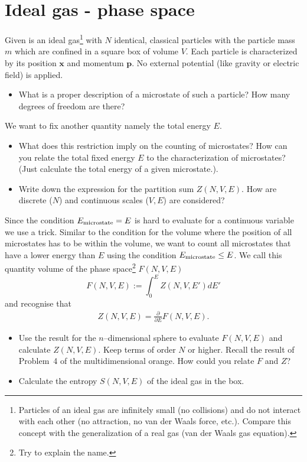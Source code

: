 \documentclass[12pt,a4paper]{article} %
\begin{document}
 \section{Ideal gas - phase space}
 Given is an ideal gas\footnote{Particles of an ideal gas are infinitely small (no collisions) and do not interact with each other (no attraction, no van der Waals force, etc.). Compare this concept with the generalization of a real gas (van der Waals gas equation).} with $N$ identical, classical particles with the particle mass $m$ which are confined in a square box of volume $V$.
 Each particle is characterized by its position $\boldsymbol{x}$ and momentum $\boldsymbol{p}$. No external potential (like gravity or electric field) is applied.
 
 \begin{itemize}
  \item What is a proper description of a microstate of such a particle? How many degrees of freedom are there?
 \end{itemize}
 We want to fix another quantity namely the total energy $E$.
 \begin{itemize}
  \item What does this restriction imply on the counting of microstates? How can you relate the total fixed energy $E$ to the characterization of microstates? (Just calculate the total energy of a given microstate.).
 \item Write down the expression for the partition sum $Z(N,V,E)$. How are discrete ($N$) and continuous scales ($V,E$) are considered?
 \end{itemize}
 
Since the condition $E_{\textnormal{microstate}} = E$ is hard to evaluate for a continuous variable we use a trick. 
Similar to the condition for the volume where the position of all microstates has to be within the volume, we want to count all microstates that have a lower energy than $E$ using the condition $E_{\textnormal{microstate}} \leq E$. We call this quantity volume of the phase space\footnote{Try to explain the name.} $F(N,V,E)$
$$F(N,V,E) := \int_0^E Z(N,V,E') dE'$$ and recognise that
\begin{align} 
Z(N,V,E) = \frac{\partial }{\partial E}  F(N,V,E).
\end{align}

 \begin{itemize}
  \item Use the result for the $n$--dimensional sphere to evaluate $F(N,V,E)$ and calculate $Z(N,V,E)$. Keep terms of order $N$ or higher. Recall the result of Problem~4 of the multidimensional orange. How could you relate $F$ and $Z$?
  \item Calculate the entropy $S(N,V,E)$ of the ideal gas in the box.
 \end{itemize}
 
\end{document}
